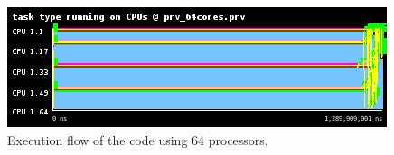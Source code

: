 \documentclass[12pt, a4paper]{article}
\begin{document}
\begin{figure}[H]
	\centering
	\includegraphics[scale=0.75]{./images/S1_scalability/S1_scalability_64}
	
	\label{fig_ann:S1_scalability_64}
	\caption{Execution flow of the code using 64 processors.}
\end{figure}
\end{document}
